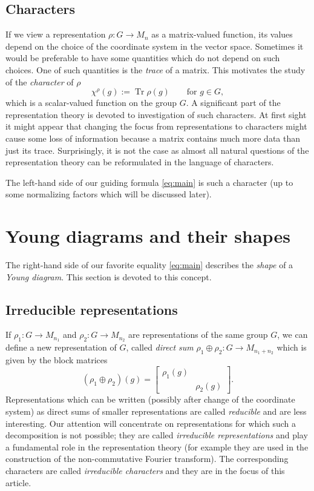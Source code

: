 \documentclass{emsprocart}
\theoremstyle{definition}
\begin{document}
\subsection{Characters}
If we view a representation $\rho:G \to M_n$ as a matrix-valued function, 
its values depend on the choice of the coordinate system in the vector space. Sometimes it would be preferable
to have some quantities which do not depend on such choices. One of such quantities is the \emph{trace} of a matrix. This motivates the study of the \emph{character} of $\rho$
$$ \chi^\rho(g) := \operatorname{Tr} \rho(g) \qquad \text{for } g\in G,$$
which is a scalar-valued function on the group $G$.
A significant part of the representation theory is devoted to investigation of such characters. At first sight it might appear 
that changing the focus from representations to characters might cause some loss of information because
a matrix contains much more data than just its trace. Surprisingly, it is not the case as
almost all natural questions of the representation theory can be reformulated in the language of characters.

The left-hand side of our guiding formula \eqref{eq:main} is such a character (up to some normalizing factors which will be 
discussed later).

\section{Young diagrams and their shapes}

The right-hand side of our favorite equality \eqref{eq:main} describes the \emph{shape} of a \emph{Young diagram}.
This section is devoted to this concept.

\subsection{Irreducible representations}
\label{subsec:irreducible}
If $\rho_1:G\rightarrow M_{n_1}$ and $\rho_2:G\rightarrow M_{n_2}$ are representations of the same group $G$,
we can define a new representation of $G$, called \emph{direct sum} $\rho_1\oplus \rho_2:G\rightarrow M_{n_1+n_2}$ which is given by the block matrices
$$ (\rho_1\oplus\rho_2)(g) = 
\begin{bmatrix}
 \rho_1(g) &    \\
           & \rho_2(g)
\end{bmatrix}. 
$$
Representations which can be written (possibly after change of the coordinate system) as direct sums of smaller representations  are called \emph{reducible} and are less interesting. Our attention will concentrate on representations for which such a decomposition is not possible; they are called \emph{irreducible representations} and  play a fundamental role in the representation theory
(for example they are used in the construction of the non-commutative Fourier transform). The corresponding
characters are called \emph{irreducible characters} and they are in the focus of this article.
\end{document}

